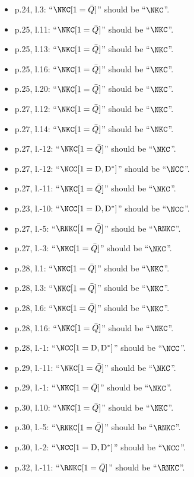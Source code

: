 \documentclass{amsart}
\theoremstyle{definition}
\newcommand{\dual}{^*} %
\newcommand{\dissection}{\mathrm{D}} %
\begin{document}
\begin{enumerate}
\begin{itemize}
    \item p.24, l.3: ``$\NKC[1=\bar Q]$'' should be ``$\NKC$''.
    \item p.25, l.11: ``$\NKC[1=\bar Q]$'' should be ``$\NKC$''.
    \item p.25, l.13: ``$\NKC[1=\bar Q]$'' should be ``$\NKC$''.
    \item p.25, l.16: ``$\NKC[1=\bar Q]$'' should be ``$\NKC$''.
    \item p.25, l.20: ``$\NKC[1=\bar Q]$'' should be ``$\NKC$''.
    \item p.27, l.12: ``$\NKC[1=\bar Q]$'' should be ``$\NKC$''.
    \item p.27, l.14: ``$\NKC[1=\bar Q]$'' should be ``$\NKC$''.
    \item p.27, l.-12: ``$\NKC[1=\bar Q]$'' should be ``$\NKC$''.
    \item p.27, l.-12: ``$\NCC[1=\dissection,\dissection\dual]$'' should be ``$\NCC$''.
    \item p.27, l.-11: ``$\NKC[1=\bar Q]$'' should be ``$\NKC$''.
    \item p.23, l.-10: ``$\NCC[1=\dissection,\dissection\dual]$'' should be ``$\NCC$''.    
    \item p.27, l.-5: ``$\RNKC[1=\bar Q]$'' should be ``$\RNKC$''.
    \item p.27, l.-3: ``$\NKC[1=\bar Q]$'' should be ``$\NKC$''.
    \item p.28, l.1: ``$\NKC[1=\bar Q]$'' should be ``$\NKC$''.
    \item p.28, l.3: ``$\NKC[1=\bar Q]$'' should be ``$\NKC$''.
    \item p.28, l.6: ``$\NKC[1=\bar Q]$'' should be ``$\NKC$''.
    \item p.28, l.16: ``$\NKC[1=\bar Q]$'' should be ``$\NKC$''.
    \item p.28, l.-1: ``$\NCC[1=\dissection,\dissection\dual]$'' should be ``$\NCC$''.
    \item p.29, l.-11: ``$\NKC[1=\bar Q]$'' should be ``$\NKC$''.
    \item p.29, l.-1: ``$\NKC[1=\bar Q]$'' should be ``$\NKC$''.
    \item p.30, l.10: ``$\NKC[1=\bar Q]$'' should be ``$\NKC$''.
    \item p.30, l.-5: ``$\RNKC[1=\bar Q]$'' should be ``$\RNKC$''.
    \item p.30, l.-2: ``$\NCC[1=\dissection,\dissection\dual]$'' should be ``$\NCC$''.
    \item p.32, l.-11: ``$\RNKC[1=\bar Q]$'' should be ``$\RNKC$''.

\end{itemize}
\end{enumerate}
\end{document}
